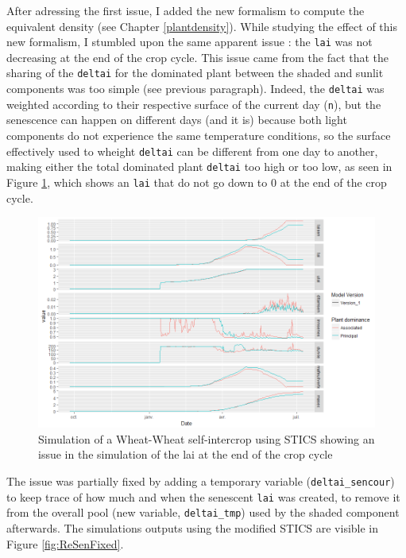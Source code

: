 \documentclass[
]{book}
\begin{document}
After adressing the first issue, I added the new formalism to compute the equivalent density (see Chapter \ref{plantdensity}). While studying the effect of this new formalism, I stumbled upon the same apparent issue : the \texttt{lai} was not decreasing at the end of the crop cycle. This issue came from the fact that the sharing of the \texttt{deltai} for the dominated plant between the shaded and sunlit components was too simple (see previous paragraph). Indeed, the \texttt{deltai} was weighted according to their respective surface of the current day (\texttt{n}), but the senescence can happen on different days (and it is) because both light components do not experience the same temperature conditions, so the surface effectively used to wheight \texttt{deltai} can be different from one day to another, making either the total dominated plant \texttt{deltai} too high or too low, as seen in Figure \ref{fig:ReSen}, which shows an \texttt{lai} that do not go down to 0 at the end of the crop cycle.

\begin{figure}
\centering
\includegraphics{img/ReSen.png}
\caption{\label{fig:ReSen}Simulation of a Wheat-Wheat self-intercrop using STICS showing an issue in the simulation of the lai at the end of the crop cycle}
\end{figure}

The issue was partially fixed by adding a temporary variable (\texttt{deltai\_sencour}) to keep trace of how much and when the senescent \texttt{lai} was created, to remove it from the overall pool (new variable, \texttt{deltai\_tmp}) used by the shaded component afterwards. The simulations outputs using the modified STICS are visible in Figure \ref{fig:ReSenFixed}.
\end{document}
